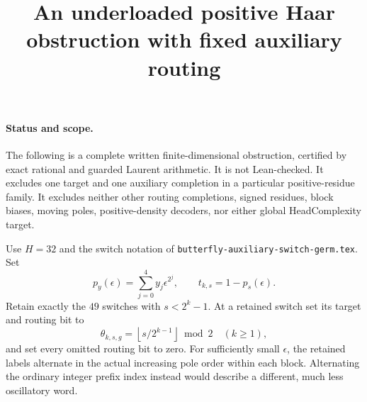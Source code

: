 \documentclass[11pt]{article}
\begin{document}
\title{An underloaded positive Haar obstruction with fixed auxiliary routing}
\author{}\date{}\maketitle
\paragraph{Status and scope.}
The following is a complete written finite-dimensional obstruction,
certified by exact rational and guarded Laurent arithmetic. It is not
Lean-checked. It excludes one target and one auxiliary completion in a
particular positive-residue family. It excludes neither other routing
completions, signed residues, block biases, moving poles, positive-density
decoders, nor either global HeadComplexity target.

Use $H=32$ and the switch notation of
\texttt{butterfly-auxiliary-switch-germ.tex}. Set
\[
 p_y(\epsilon)=\sum_{j=0}^4y_j\epsilon^{2^j},\qquad
 t_{k,s}=1-p_s(\epsilon).
\]
Retain exactly the $49$ switches with $s<2^k-1$. At a retained switch
set its target and routing bit to
\[
 \theta_{k,s,g}=\left\lfloor s/2^{k-1}\right\rfloor\bmod2
 \quad(k\geq1),
\]
and set every omitted routing bit to zero. For sufficiently small
$\epsilon$, the retained labels alternate in the actual increasing
pole order within each block. Alternating the ordinary integer prefix
index instead would describe a different, much less oscillatory word.
\end{document}
